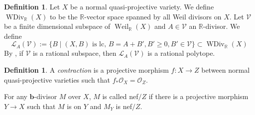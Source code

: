 \documentclass[11pt]{amsart}
\numberwithin{equation}{section}
\newcommand{\bb}{\bm{b}}
\newcommand{\Rr}{\mathbb{R}}
\newcommand{\Oo}{\mathcal{O}}
\newcommand{\Weil}{\operatorname{Weil}}
\theoremstyle{definition}
\newtheorem{defn}[thm]{Definition}
\theoremstyle{definition}
\theoremstyle{definition}
\begin{document}
\begin{defn} Let $X$ be a normal quasi-projective variety. We define $\operatorname{WDiv}_{\mathbb{R}}(X)$ to be the $\Rr$-vector space spanned by all Weil divisors on $X$. Let $\mathcal{V}$ be a finite dimensional subspace of $\Weil_{\Rr}(X)$ and $A\in\mathcal{V}$ an $\mathbb R$-divisor. We define 
  \[
    \mathcal{L}_{A}(\mathcal{V}):=\{B\mid(X,B) \text{ is lc, } B=A+B', B'\geq 0, B'\in \mathcal{V}\}\subset \operatorname{WDiv}_{\Rr}(X)
  \]
By \cite[Lemma 3.7.2]{BCHM10}, if $\mathcal{V}$ is a rational subspace, then $\mathcal{L}_{A}(\mathcal{V})$ is a rational polytope.
\end{defn}



\begin{defn}
A \emph{contraction} is a projective morphism $f:X\to Z$ between normal quasi-projective varieties such that $f_{*}\Oo_X=\Oo_Z$. 

For any $\bb$-divisor $M$ over $X$, $M$ is called nef$/Z$ if there is a projective morphism $Y\rightarrow X$ such that $M$ is on $Y$ and $M_Y$ is nef$/Z$.
\end{defn}
\end{document}
